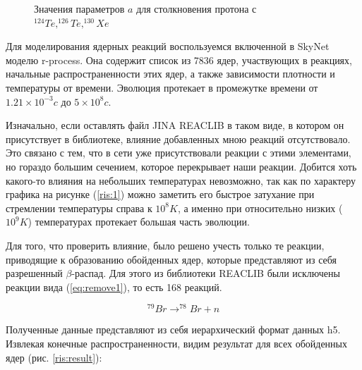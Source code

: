 \documentclass[%
master,    %
natbib,      %
subf,        %
href,        %
colorlinks,  %
]{disser}
\begin{document}
\begin{figure}
	\caption{Значения параметров $a$ для столкновения протона с $^{124}Te, ^{126}Te, ^{130}Xe$}
	\label{ris:a-4}
\end{figure}

Для моделирования ядерных реакций воспользуемся включенной в SkyNet моделю r-process. Она содержит список из 7836 ядер, участвующих в реакциях, начальные распространенности этих ядер, а также зависимости плотности и температуры от времени. Эволюция протекает в промежутке времени от $1.21\times 10^{-3}c$ до $5\times 10^8c$. 

Изначально, если оставлять файл JINA REACLIB в таком виде, в котором он присутствует в библиотеке, влияние добавленных мною реакций отсутствовало. Это связано с тем, что в сети уже присутствовали реакции с этими элементами, но гораздо большим сечением, которое перекрывает наши реакции. Добится хоть какого-то влияния на небольших температурах невозможно, так как по характеру графика на рисунке (\ref{ris:1}) можно заметить его быстрое затухание при стремлении температуры справа к $10^8 K$, а именно при относительно низких ($10^9 K$) температурах протекает большая часть эволюции.

Для того, что проверить влияние, было решено учесть только те реакции, приводящие к образованию обойденных ядер, которые представляют из себя разрешенный $\beta$-распад. Для этого из библиотеки REACLIB были исключены реакции вида (\ref{eq:remove1}), то есть 168 реакций.

\begin{equation}
\label{eq:remove1}
	^{79}Br \to ^{78}Br + n
\end{equation}

Полученные данные представляют из себя иерархический формат данных h5. Извлекая конечные распространенности, видим результат для всех обойденных ядер (рис. \ref{ris:result}):
\end{document}
